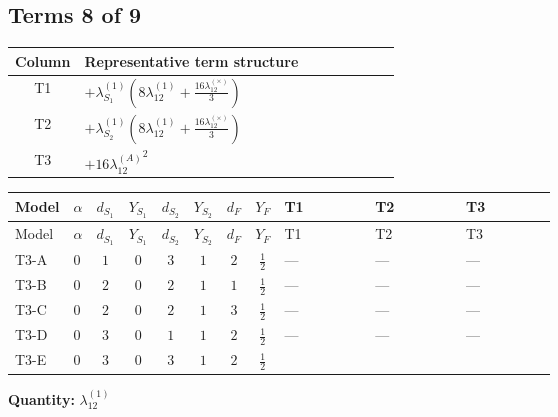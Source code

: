 \documentclass[8pt]{article}
\begin{document}
\begin{landscape}
\subsection*{Terms 8 of 9}
\begin{center}
\begin{tabular}{@{}c >{\raggedright\arraybackslash}p{0.82\linewidth}@{}}
\toprule
Column & Representative term structure \\
\midrule
T1 & \(\displaystyle +{\lambda_{S_1}^{(1)}} \left(8 {\lambda_{12}^{(1)}}+\frac{16 {\lambda_{12}^{(\times)}}}{3}\right)\) \\
\midrule
T2 & \(\displaystyle +{\lambda_{S_2}^{(1)}} \left(8 {\lambda_{12}^{(1)}}+\frac{16 {\lambda_{12}^{(\times)}}}{3}\right)\) \\
\midrule
T3 & \(\displaystyle +16 {\lambda_{12}^{(A)}}^2\) \\
\midrule
\bottomrule
\end{tabular}
\end{center}
\smallskip
\tiny
\begin{longtable}{@{}llcccccc >{\raggedright\arraybackslash}p{0.21\linewidth} >{\raggedright\arraybackslash}p{0.21\linewidth} >{\raggedright\arraybackslash}p{0.21\linewidth}@{}}
\toprule
Model & $\alpha$ & $d_{S_1}$ & $Y_{S_1}$ & $d_{S_2}$ & $Y_{S_2}$ & $d_F$ & $Y_F$ & T1 & T2 & T3 \\
\midrule
\endfirsthead
\toprule
Model & $\alpha$ & $d_{S_1}$ & $Y_{S_1}$ & $d_{S_2}$ & $Y_{S_2}$ & $d_F$ & $Y_F$ & T1 & T2 & T3 \\
\midrule
\endhead
T3-A & $0$ & $1$ & $0$ & $3$ & $1$ & $2$ & $\frac{1}{2}$ & --- & --- & --- \\
\midrule
T3-B & $0$ & $2$ & $0$ & $2$ & $1$ & $1$ & $\frac{1}{2}$ & --- & --- & --- \\
\midrule
T3-C & $0$ & $2$ & $0$ & $2$ & $1$ & $3$ & $\frac{1}{2}$ & --- & --- & --- \\
\midrule
T3-D & $0$ & $3$ & $0$ & $1$ & $1$ & $2$ & $\frac{1}{2}$ & --- & --- & --- \\
\midrule
T3-E & $0$ & $3$ & $0$ & $3$ & $1$ & $2$ & $\frac{1}{2}$ & \scriptsize\adjustbox{max width=\linewidth}{$\begin{gathered} +{\lambda_{S_1}^{(1)}} \left(8 {\lambda_{12}^{(1)}}+\frac{16 {\lambda_{12}^{(\times)}}}{3}\right)\end{gathered}$} & \scriptsize\adjustbox{max width=\linewidth}{$\begin{gathered} +{\lambda_{S_2}^{(1)}} \left(8 {\lambda_{12}^{(1)}}+\frac{16 {\lambda_{12}^{(\times)}}}{3}\right)\end{gathered}$} & \scriptsize\adjustbox{max width=\linewidth}{$\begin{gathered} +16 {\lambda_{12}^{(A)}}^2\end{gathered}$} \\
\midrule
\bottomrule
\end{longtable}
\clearpage
\noindent\textbf{Quantity: }$\lambda_{12}^{(1)}$\par\smallskip

\end{landscape}
\end{document}
